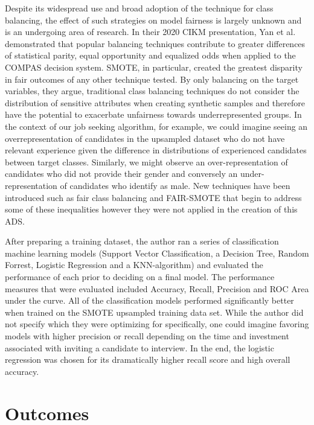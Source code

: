 Despite its widespread use and broad adoption of the technique for class balancing, the effect of such strategies on model fairness is largely unknown and is an undergoing area of research. In their 2020 CIKM presentation, Yan et al. demonstrated that popular balancing techniques contribute to greater differences of statistical parity, equal opportunity and equalized odds when applied to the COMPAS decision system. SMOTE, in particular, created the greatest disparity in fair outcomes of any other technique tested. By only balancing on the target variables, they argue, traditional class balancing techniques do not consider the distribution of sensitive attributes when creating synthetic samples and therefore have the potential to exacerbate unfairness towards underrepresented groups. In the context of our job seeking algorithm, for example, we could imagine seeing an over\-representation of candidates in the upsampled dataset who do not have relevant experience given the difference in distributions of experienced candidates between target classes. Similarly, we might observe an over-representation of candidates who did not provide their gender and conversely an under-representation of candidates who identify as male.  New techniques have been introduced such as 
fair class balancing and FAIR-SMOTE that begin to address some of these inequalities however they were not applied in the creation of this ADS.

After preparing a training dataset, the author ran a series of classification machine learning models (Support Vector Classification, a Decision Tree, Random Forrest, Logistic Regression and a KNN-algorithm) and evaluated the performance of each prior to deciding on a final model.  The 
performance measures that were evaluated included Accuracy, Recall, Precision and ROC Area under the curve. All of the classification models performed significantly better when trained on the SMOTE upsampled training data set.  While the author did not specify which they were optimizing for specifically, one could imagine favoring models with higher precision or recall depending on the time and investment associated with inviting a candidate to interview.  In the end, the logistic regression was chosen for its dramatically higher recall score and high overall accuracy.


\pagebreak

\section{Outcomes}

